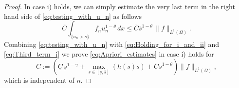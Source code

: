 \documentclass[11pt,a4paper]{amsart}
\theoremstyle{definition}
\theoremstyle{plain}
\numberwithin{equation}{section}
\begin{document}
{\begin{proof}
In case {\rm i)} holds, we can simply estimate the  very last term in the right hand side of \eqref{eq:testing_with_u_n} as follows
\begin{equation}\label{eq:Third_term_i}
\overline{C}\int_{\{u_n>\overline{s}\}}f_n u_n^{1-\theta}\,dx
\leq \overline{C}\overline{s}^{1-\theta}\, \|f\|_{L^{1}(\Omega)}.
\end{equation}  
Combining \eqref{eq:testing_with_u_n} with \eqref{eq:Holding_for_i_and_ii} and \eqref{eq:Third_term_i} we prove \eqref{eq:Apriori_estimates} in case {\rm i)} holds for 
\begin{equation*}
C:= \left( \underline{C}\, \underline{s}^{1-\gamma} + \max_{s \in [\underline{s},\overline{s}]}(h(s)s) + \overline{C}\overline{s}^{1-\theta}\right)\|f\|_{L^{1}(\Omega)},
\end{equation*}
\noindent which is independent of $n$.


\end{proof}}
\end{document}

